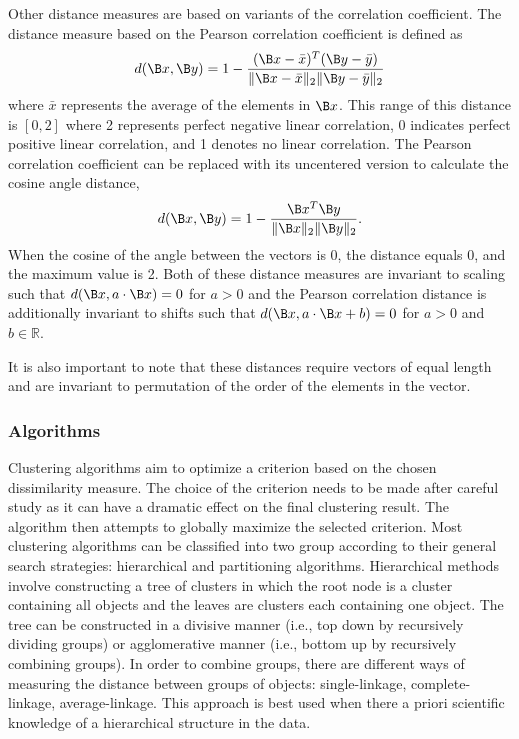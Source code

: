 Other distance measures are based on variants of the correlation coefficient. The distance measure based on the Pearson correlation coefficient is defined as
$$d(\B x,\B y) =1 - \frac{(\B x - \bar{x})^{T}(\B y - \bar{y})}{\|\B x - \bar{x}\|_{2}\|\B y - \bar{y}\|_{2}}$$
where $\bar{x}$ represents the average of the elements in $\B x$. This range of this distance is $[0,2]$ where 2 represents perfect negative linear correlation, 0 indicates perfect positive linear correlation, and 1 denotes no linear correlation. The Pearson correlation coefficient can be replaced with its uncentered version to calculate the cosine angle distance,
$$d(\B x,\B y) =1 - \frac{\B x ^{T}\B y }{\|\B x\|_{2}\|\B y \|_{2}}.$$
When the cosine of the angle between the vectors is 0, the distance equals 0, and the maximum value is 2. Both of these distance measures are invariant to scaling such that $d(\B x, a\cdot \B x) = 0$ for $a>0$ and the Pearson correlation distance is additionally invariant to shifts such that $d(\B x, a\cdot \B x +b) = 0$ for $a>0$ and $b\in \mathbb{R}$. 

It is also important to note that these distances require vectors of equal length and are invariant to permutation of the order of the elements in the vector.

\subsubsection{Algorithms}
Clustering algorithms aim to optimize a criterion based on the chosen dissimilarity measure. The choice of the criterion needs to be made after careful study as it can have a dramatic effect on the final clustering result. The algorithm then attempts to globally maximize the selected criterion. Most clustering algorithms can be classified into two group according to their general search strategies: hierarchical and partitioning algorithms. Hierarchical methods involve constructing a tree of clusters in which the root node is a cluster containing all objects and the leaves are clusters each containing one object. The tree can be constructed in a divisive manner (i.e., top down by recursively dividing groups) or agglomerative manner (i.e., bottom up by recursively combining groups). In order to combine groups, there are different ways of measuring the distance between groups of objects: single-linkage, complete-linkage, average-linkage. This approach is best used when there a priori scientific knowledge of a hierarchical structure in the data.

